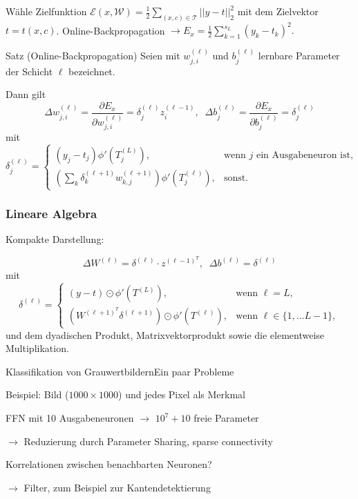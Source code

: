 \documentclass[10pt]{beamer} %
\begin{document}
\begin{frame}
   Wähle Zielfunktion $\mathcal{E}(x,\mathcal{W})= \frac{1}{2} \sum_{(x,c) \in \mathcal{T}} ||y-t||_2^2$ mit dem Zielvektor $t=t(x,c)$. Online-Backpropagation $\rightarrow E_x=\frac{1}{2} \sum_{k=1}^{s_L} (y_k-t_k)^2.$
   \pause
   \begin{block}{Satz (Online-Backpropagation)}
   Seien mit $w_{j,i}^{(\ell)}$ und $b_j^{(\ell)}$ lernbare Parameter der Schicht $\ell$ bezeichnet.

   Dann gilt 
   \begin{equation*}
       \Delta w^{(\ell)}_{j,i}= \frac{\partial E_x}{\partial w^{(\ell)}_{j,i}}= \delta^{(\ell)}_j z^{(\ell-1)}_i, \; \;
       \Delta b^{(\ell)}_{j}= \frac{\partial E_x}{\partial b^{(\ell)}_{j}}= \delta^{(\ell)}_j
   \end{equation*}
   mit 
   \begin{equation*}
       \delta^{(\ell)}_j=
       \begin{cases}
           (y_j-t_j) \phi'(T^{(L)}_j), &\text{wenn $j$ ein Ausgabeneuron ist}, \\
           \left(\sum_{k} \delta^{(\ell+1)}_k w^{(\ell+1)}_{k,j}\right) \phi'(T_j^{(\ell)}), &\text{sonst}.
       \end{cases}
   \end{equation*}
\end{block} 
\end{frame}

\begin{frame}
   \frametitle[]{Lineare Algebra}
   Kompakte Darstellung: 

   \begin{equation*}
      \Delta W^{(\ell)}= \delta^{(\ell)} \cdot z^{{(\ell-1)}^T}, \; \;
      \Delta b^{(\ell)}= \delta^{(\ell)}  
   \end{equation*}
  mit 
  \begin{equation*}
      \delta^{(\ell)}=
      \begin{cases}
          (y-t) \odot \phi'(T^{(L)}), &\text{wenn $\ell=L$}, \\
          \left(W^{{(\ell+1)}^T} \delta^{(\ell+1)}\right) \odot \phi'(T^{(\ell)}), &\text{wenn $\ell \in \{1, \ldots L-1\}$},
      \end{cases}
  \end{equation*}
  und dem dyadischen Produkt, Matrixvektorprodukt sowie die elementweise Multiplikation.
\end{frame}

\begin{frame}{Klassifikation von Grauwertbildern}{Ein paar Probleme}

   Beispiel: Bild ($1000 \times 1000$) und jedes Pixel als Merkmal

   FFN mit 10 Ausgabeneuronen $\rightarrow$ $10^7+10$ freie Parameter

   $\rightarrow$ Reduzierung durch Parameter Sharing, sparse connectivity

   Korrelationen zwischen benachbarten Neuronen?
   
   $\rightarrow$ Filter, zum Beispiel zur Kantendetektierung
\end{frame}
\end{document}
